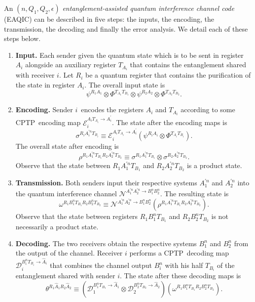 \documentclass[aps,11pt,twoside,letterpaper]{article}
\begin{document}
		An $(n,Q_{1},Q_{2},\epsilon)$ \textit{entanglement-assisted quantum
		interference channel code} (EAQIC) can be described in five steps: the inputs,
		the encoding, the transmission, the decoding and finally the error analysis.
		We detail each of these steps below.
		
		\begin{enumerate}

		\item {\bf Input.} 
		Each sender given the quantum state which is to be sent in register
		$A_{i}$ alongside an auxiliary register $T_{A_{i}}$ that contains the entanglement shared
		with receiver $i$. Let $R_{i}$ be a quantum register that contains the
		purification of the state in register $A_{i}$. The overall input state is%
		\[
		\psi^{R_{1}A_{1}}\otimes\Phi^{T_{A_{1}}T_{B_{1}}}\otimes\psi^{R_{2}A_{2}%
		}\otimes\Phi^{T_{A_{2}}T_{B_{2}}}.
		\]

		\item \textbf{Encoding.} 
		Sender $i$\ encodes the registers $A_{i}$ and
		$T_{A_{i}}$ according to some CPTP\ encoding map $\mathcal{E}_{i}%
		^{A_{i}T_{A_{i}}\rightarrow A_{i}^{\prime}}$. The state after the encoding
		maps is%
		\[
		\sigma^{R_{i}A_{i}^{\prime n}T_{B_{i}}}\equiv\mathcal{E}_{i}^{A_{i}T_{A_{i}%
		}\rightarrow A_{i}^{\prime}}(\psi^{R_{i}A_{i}}\otimes\Phi^{T_{A_{i}}T_{B_{i}}%
		}).
		\]
		The overall state after encoding is%
		\[
		\rho^{R_{1}A_{1}^{\prime n}T_{B_{1}}R_{2}A_{2}^{\prime n}T_{B_{2}}}%
		\equiv\sigma^{R_{1}A_{1}^{\prime n}T_{B_{1}}}\otimes\sigma^{R_{2}A_{2}^{\prime
		n}T_{B_{2}}}.
		\]
		Observe that the state between $R_{1}A_{1}^{\prime n}T_{B_{1}}$ and
		$R_{2}A_{2}^{\prime n}T_{B_{2}}$ is a product state.

		\item \textbf{Transmission.} 
		Both senders input their respective systems
		$A_{1}^{\prime n}$ and $A_{2}^{\prime n}$ into the quantum
		interference channel $\mathcal{N}^{A_{1}^{\prime n}A_{2}^{\prime n}\rightarrow
		B_{1}^{n}B_{2}^{n}}$. The resulting state is%
		\[
		\omega^{R_{1}B_{1}^{n}T_{B_{1}}R_{2}B_{2}^{n}T_{B_{2}}}\equiv\mathcal{N}%
		^{A_{1}^{\prime n}A_{2}^{\prime n}\rightarrow B_{1}^{n}B_{2}^{n}}(\rho
		^{R_{1}A_{1}^{\prime n}T_{B_{1}}R_{2}A_{2}^{\prime n}T_{B_{2}}}).
		\]
		Observe that the state between registers $R_{1}B_{1}^{n}T_{B_{1}}$ and
		$R_{2}B_{2}^{n}T_{B_{2}}$ is not necessarily a product state.

		\item \textbf{Decoding.} The two receivers obtain the respective systems
		$B_{1}^{n}$ and $B_{2}^{n}$ from the output of the channel. Receiver $i$
		performs a CPTP\ decoding map $\mathcal{D}_{i}^{B_{i}^{n}T_{B_{i}}%
		\rightarrow\hat{A}_{i}}$ that combines the channel output $B_{i}^{n}$ with his
		half $T_{B_{i}}$ of the entanglement shared with sender $i$. The state after
		these decoding maps is%
		\[
		\theta^{R_{1}\hat{A}_{1}R_{2}\hat{A}_{2}}\equiv(\mathcal{D}_{1}^{B_{1}%
		^{n}T_{B_{1}}\rightarrow\hat{A}_{1}}\otimes\mathcal{D}_{2}^{B_{2}^{n}T_{B_{2}%
		}\rightarrow\hat{A}_{2}})(\omega^{R_{1}B_{1}^{n}T_{B_{1}}R_{2}B_{2}%
		^{n}T_{B_{2}}}).
		\]
		

\end{enumerate}
\end{document}
